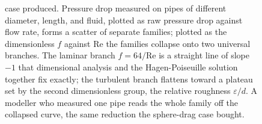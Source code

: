 \begin{figure}[htbp]
{case produced. Pressure drop measured on pipes of different diameter,
length, and fluid, plotted as raw pressure drop against flow rate, forms a
scatter of separate families; plotted as the dimensionless $f$ against
$\mathrm{Re}$ the families collapse onto two universal branches. The
laminar branch $f = 64/\mathrm{Re}$ is a straight line of slope $-1$ that
dimensional analysis and the Hagen-Poiseuille solution together fix
exactly; the turbulent branch flattens toward a plateau set by the second
dimensionless group, the relative roughness $\varepsilon/d$. A modeller
who measured one pipe reads the whole family off the collapsed curve, the
same reduction the sphere-drag case bought.}
\label{fig:vol02ch18:pipe-friction-collapse}
\end{figure}
